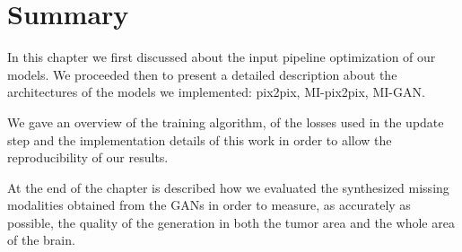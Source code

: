 \section{Summary}
\label{sec:4th_section_summary}
In this chapter we first discussed about the input pipeline optimization of our models. We proceeded then to present a detailed description about the architectures of the models we implemented: pix2pix, MI-pix2pix, MI-GAN.

We gave an overview of the training algorithm, of the losses used in the update step and the implementation details of this work in order to allow the reproducibility of our results.

At the end of the chapter is described how we evaluated the synthesized missing modalities obtained from the \ac{GAN}s in order to measure, as accurately as possible, the quality of the generation in both the tumor area and the whole area of the brain.